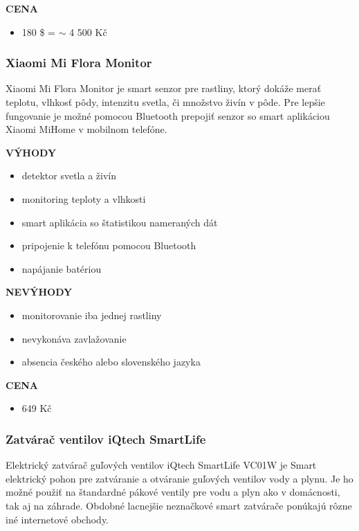 \documentclass[twoside]{ctuthesis}
\theoremstyle{plain}
\theoremstyle{definition}
\theoremstyle{note}
\begin{document}
\textbf{CENA}
\begin{itemize}
\item 180  \$ = $\sim$ 4 500 Kč
\end{itemize}

\subsubsection*{Xiaomi Mi Flora Monitor}
Xiaomi Mi Flora Monitor je smart senzor pre rastliny, ktorý dokáže merať teplotu, vlhkosť pôdy, intenzitu svetla, či množstvo živín v pôde. Pre lepšie fungovanie je možné pomocou Bluetooth prepojiť senzor so smart aplikáciou Xiaomi MiHome v mobilnom telefóne. \cite{xiaomimiflora}
\newline

\textbf{VÝHODY}
\begin{itemize}
\item detektor svetla a živín
\item monitoring teploty a vlhkosti 
\item smart aplikácia so štatistikou nameraných dát
\item pripojenie k telefónu pomocou Bluetooth
\item napájanie batériou
\end{itemize}

\textbf{NEVÝHODY}
\begin{itemize}
\item monitorovanie iba jednej rastliny
\item nevykonáva zavlažovanie
\item absencia českého alebo slovenského jazyka
\end{itemize}

\textbf{CENA}
\begin{itemize}
\item 649 Kč
\end{itemize}

\subsubsection*{Zatvárač ventilov iQtech SmartLife}
\label{sec:agora}
Elektrický zatvárač guľových ventilov iQtech SmartLife VC01W je Smart elektrický pohon pre zatváranie a otváranie guľových ventilov vody a plynu.
Je ho možné použiť na štandardné pákové ventily pre vodu a plyn ako v domácnosti, tak aj na záhrade. Obdobné lacnejšie neznačkové smart zatvárače ponúkajú rôzne iné internetové obchody. \cite{agora}
\newline
\end{document}
